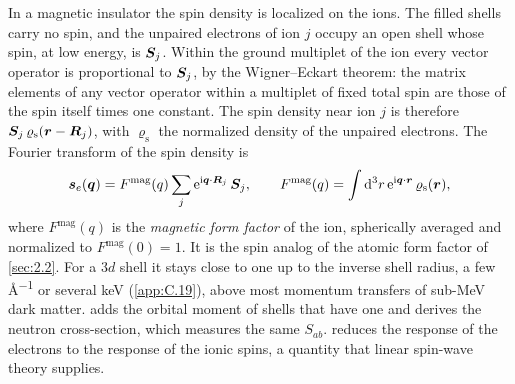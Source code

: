 In a magnetic insulator the spin density is localized on the ions. The filled shells carry no spin, and the unpaired electrons of ion $j$ occupy an open shell whose spin, at low energy, is $\bm{S}_j$. Within the ground multiplet of the ion every vector operator is proportional to $\bm{S}_j$, by the Wigner--Eckart theorem: the matrix elements of any vector operator within a multiplet of fixed total spin are those of the spin itself times one constant. The spin density near ion $j$ is therefore $\bm{S}_j\,\varrho_{\mathrm{s}}(\bm{r} - \bm{R}_j)$, with $\varrho_{\mathrm{s}}$ the normalized density of the unpaired electrons. The Fourier transform of the spin density is
\begin{equation}
  \bm{s}_e(\bm{q}) = F^{\mathrm{mag}}(q)\sum_j\mathrm{e}^{\mathrm{i}\bm{q}\cdot\bm{R}_j}\,\bm{S}_j, \qquad
  F^{\mathrm{mag}}(q) = \int\mathrm{d}^3r\,\mathrm{e}^{\mathrm{i}\bm{q}\cdot\bm{r}}\,\varrho_{\mathrm{s}}(\bm{r}) ,
  \label{eq:7.1-Fmag}
\end{equation}
where $F^{\mathrm{mag}}(q)$ is the \emph{magnetic form factor} of the ion, spherically averaged and normalized to $F^{\mathrm{mag}}(0) = 1$. It is the spin analog of the atomic form factor of \cref{sec:2.2}. For a $3d$ shell it stays close to one up to the inverse shell radius, a few \si{\angstrom^{-1}} or several keV (\cref{app:C.19}), above most momentum transfers of sub-MeV dark matter.  adds the orbital moment of shells that have one and derives the neutron cross-section, which measures the same $S_{ab}$.  reduces the response of the electrons to the response of the ionic spins, a quantity that linear spin-wave theory supplies.

